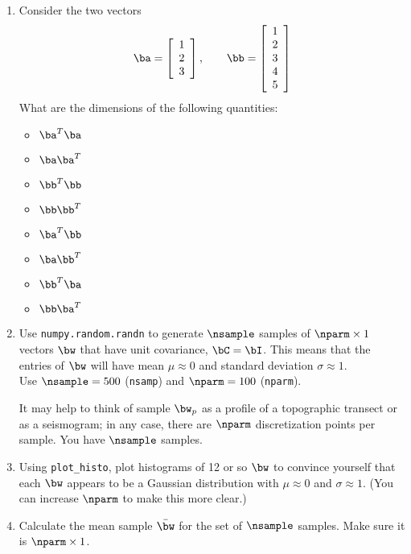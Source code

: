 \documentclass[11pt,titlepage,fleqn]{article}
\begin{document}
\begin{enumerate}
\item Consider the two vectors
%
\begin{equation*}
\ba =  \left[ \begin{array}{r} 1 \\ 2 \\ 3 \end{array} \right],
\quad\quad
\bb =  \left[ \begin{array}{r} 1 \\ 2 \\ 3 \\ 4 \\ 5 \end{array} \right]
\end{equation*}
%
What are the dimensions of the following quantities:
%
\begin{itemize}
\item $\ba^T \ba$
\item $\ba \ba^T$
\item $\bb^T \bb$
\item $\bb \bb^T$
\item $\ba^T \bb$
\item $\ba \bb^T$
\item $\bb^T \ba$
\item $\bb \ba^T$
\end{itemize}

\item Use \verb+numpy.random.randn+ to generate $\nsample$ samples of $\nparm \times 1$ vectors $\bw$ that have unit covariance, $\bC = \bI$.
This means that the entries of $\bw$ will have mean $\mu \approx 0$ and standard deviation $\sigma \approx 1$. \\
Use $\nsample = 500$ (\verb+nsamp+) and $\nparm = 100$ (\verb+nparm+).

It may help to think of sample $\bw_p$ as a profile of a topographic transect or as a seismogram; in any case, there are $\nparm$ discretization points per sample. You have $\nsample$ samples.

\item Using \verb+plot_histo+, plot histograms of 12 or so $\bw$ to convince yourself that each $\bw$ appears to be a Gaussian distribution with $\mu \approx 0$ and $\sigma \approx 1$. (You can increase $\nparm$ to make this more clear.)

\item Calculate the mean sample $\bar{\bw}$ for the set of $\nsample$ samples. Make sure it is $\nparm \times 1$.


\end{enumerate}
\end{document}
